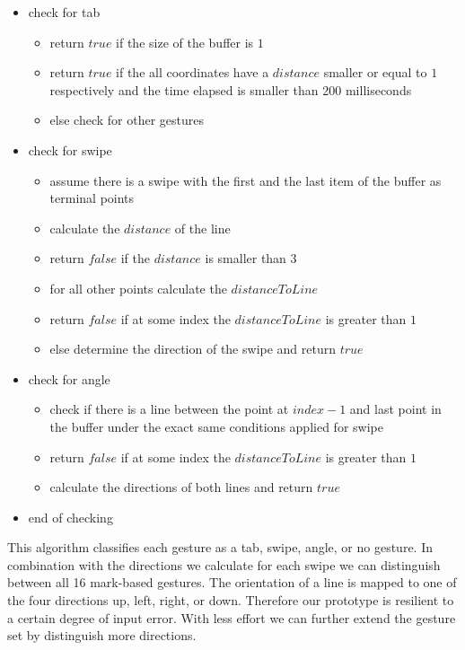 \begin{itemize}
\item check for tab
	\begin{itemize}
		\item return $true$ if the size of the buffer is $1$ 
		\item return $true$ if the all coordinates have a $distance$ smaller or equal to $1$ respectively and the time elapsed is smaller than 200 milliseconds
		\item else check for other gestures
	\end{itemize}
\item check for swipe
	\begin{itemize}
	\item assume there is a swipe with the first and the last item of the buffer as terminal points
	\item calculate the $distance$ of the line
	\item return $false$ if the $distance$ is smaller than $3$
	\item for all other points calculate the $distanceToLine$ 
	\item return $false$ if at some index the $distanceToLine$ is greater than $1$
	\item else determine the direction of the swipe and return $true$
	\end{itemize}
\item check for angle
	\begin{itemize}
	\item check if there is a line between the point at $ index - 1$ and last point in the buffer under the exact same conditions applied for swipe
	\item return $false$ if at some index the $distanceToLine$ is greater than $1$
	\item calculate the directions of both lines and return $true$
	\end{itemize}
\item end of checking 
\end{itemize}
This algorithm classifies each gesture as a tab, swipe, angle, or no gesture. In combination with the directions we calculate for each swipe we can distinguish between all 16 mark-based gestures. The orientation of a line is mapped to one of the four directions up, left, right, or down. Therefore our prototype is resilient to a certain degree of input error. With less effort we can further extend the gesture set by distinguish more directions. 
\\ \\
